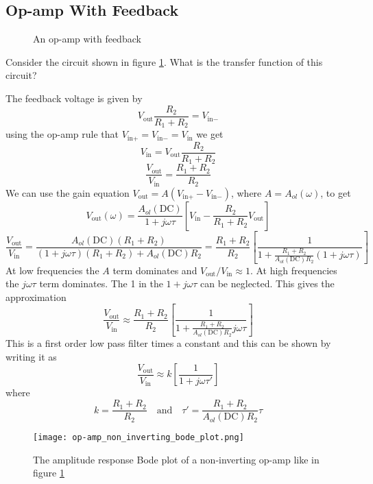 \documentclass{article}
\begin{document}
    \subsection{Op-amp With Feedback}
    \begin{figure}[ht]
        \centering
        \caption{An op-amp with feedback}
        \label{fig:op-amp with feedback}
    \end{figure}
    Consider the circuit shown in figure \ref{fig:op-amp with feedback}.
    What is the transfer function of this circuit?
    
    The feedback voltage is given by
    \[V_\text{out}\frac{R_2}{R_1 + R_2} = V_{\text{in}-}\]
    using the op-amp rule that \(V_{\text{in}+} = V_{\text{in}-} = V_\text{in}\) we get
    \[V_\text{in} = V_\text{out}\frac{R_2}{R_1 + R_2}\]
    \[\frac{V_\text{out}}{V_\text{in}} = \frac{R_1 + R_2}{R_2}\]
    We can use the gain equation \(V_\text{out} = A(V_{\text{in}+} - V_{\text{in}-})\), where \(A = A_{ol}(\omega)\), to get
    \[V_\text{out}(\omega) = \frac{A_{ol}(\text{DC})}{1 + j\omega\tau}\left[V_\text{in} - \frac{R_2}{R_1 + R_2}V_\text{out}\right]\]
    \[\frac{V_\text{out}}{V_\text{in}} = \frac{A_{ol}(\text{DC})(R_1 + R_2)}{(1 + j\omega\tau)(R_1 + R_2) + A_{ol}(\text{DC})R_2} = \frac{R_1 + R_2}{R_2}\left[ \frac{1}{1 + \frac{R_1 + R_2}{A_{ol}(\text{DC})R_2}(1 + j\omega\tau)}\right]\]
    At low frequencies the \(A\) term dominates and \(V_\text{out}/V_\text{in}\approx 1\). 
    At high frequencies the \(j\omega\tau\) term dominates.
    The 1 in the \(1 + j\omega\tau\) can be neglected.
    This gives the approximation
    \[\frac{V_\text{out}}{V_\text{in}}\approx \frac{R_1 + R_2}{R_2}\left[\frac{1}{1 + \frac{R_1 + R_2}{A_{ol}(\text{DC})R_2}j\omega\tau}\right]\]
    This is a first order low pass filter times a constant and this can be shown by writing it as
    \[\frac{V_\text{out}}{V_\text{in}}\approx k\left[\frac{1}{1 + j\omega\tau'}\right]\]
    where
    \[k = \frac{R_1 + R_2}{R_2}\quad\text{and}\quad \tau' = \frac{R_1 + R_2}{A_{ol}(\text{DC})R_2}\tau\]
    \begin{figure}[ht]
        \centering
        \texttt{[image: op-amp\_non\_inverting\_bode\_plot.png]}
        \caption{The amplitude response Bode plot of a non-inverting op-amp like in figure \ref{fig:op-amp with feedback}}
    \end{figure}
\end{document}
